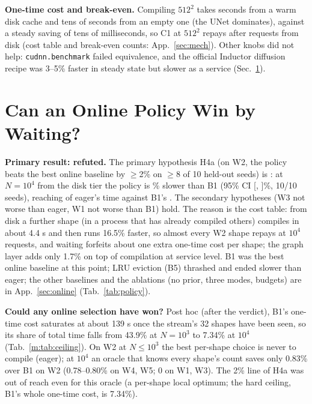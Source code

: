 \documentclass[conference]{IEEEtran}
\newcommand{\tn}[1]{#1}%
\begin{document}
\textbf{One-time cost and break-even.} Compiling $512^2$ takes seconds from a warm disk cache and tens of seconds from an empty one (the UNet dominates), against a steady saving of tens of milliseconds, so C1 at $512^2$ repays after \NBreakCompileDiskFiveTwelve{} requests from disk (cost table and break-even counts: App.~\ref{sec:mech}). Other knobs did not help: \texttt{cudnn.benchmark} failed equivalence, and the official Inductor diffusion recipe was \tn{3--5\%} faster in steady state but slower as a service (Sec.~\ref{m:online}).

\section{Can an Online Policy Win by Waiting?}\label{m:online}
\textbf{Primary result: refuted.} The primary hypothesis H4a (on W2, the policy beats the best online baseline by $\ge$2\% on $\ge$8 of 10 held-out seeds) is \NHfourAVerdictTenK: at $N{=}10^4$ from the disk tier the policy is \NHfourAGapPctTenK\% slower than B1 (95\% CI [\NHfourABootLoPctTenK, \NHfourABootHiPctTenK]\%, 10/10 seeds), reaching \NTabWtwoOursTenK{} of eager's time against B1's \NTabWtwoBOneTenK{}. The secondary hypotheses (W3 not worse than eager, W1 not worse than B1) hold. The reason is the cost table: from disk a further shape (in a process that has already compiled others) compiles in about \tn{4.4 s} and then runs \tn{16.5\%} faster, so almost every W2 shape repays at $10^4$ requests, and waiting forfeits about one extra one-time cost per shape; the graph layer adds only \tn{1.7\%} on top of compilation at service level. B1 was the best online baseline at this point; LRU eviction (B5) thrashed and ended slower than eager; the other baselines and the ablations (no prior, three modes, budgets) are in App.~\ref{sec:online} (Tab.~\ref{tab:policy}).

\textbf{Could any online selection have won?} Post hoc (after the verdict), B1's one-time cost saturates at about \tn{139 s} once the stream's 32 shapes have been seen, so its share of total time falls from \tn{43.9\%} at $N{=}10^3$ to \tn{7.34\%} at $10^4$ (Tab.~\ref{m:tab:ceiling}). On W2 at $N{\le}10^3$ the best per-shape choice is never to compile (eager); at $10^4$ an oracle that knows every shape's count saves only \tn{0.83\%} over B1 on W2 (\tn{0.78--0.80\%} on W4, W5; 0 on W1, W3). The 2\% line of H4a was out of reach even for this oracle (a per-shape local optimum; the hard ceiling, B1's whole one-time cost, is \tn{7.34\%}).
\end{document}
